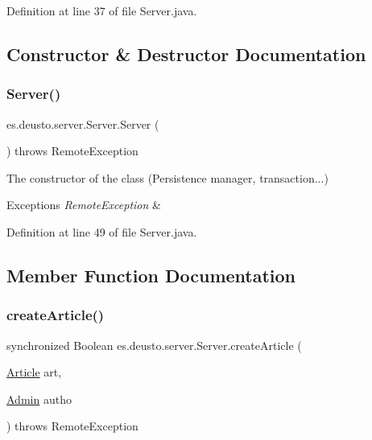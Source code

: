 Definition at line 37 of file Server.\+java.



\subsection{Constructor \& Destructor Documentation}
\mbox{\label{classes_1_1deusto_1_1server_1_1_server_a84f78162a65dd737f224eb2f94c43023}} 
\subsubsection{\texorpdfstring{Server()}{Server()}}
{\footnotesize\ttfamily es.\+deusto.\+server.\+Server.\+Server (\begin{DoxyParamCaption}{ }\end{DoxyParamCaption}) throws Remote\+Exception}

The constructor of the class (Persistence manager, transaction...)


\begin{DoxyExceptions}{Exceptions}
{\em Remote\+Exception} & \\
\hline
\end{DoxyExceptions}


Definition at line 49 of file Server.\+java.



\subsection{Member Function Documentation}
\mbox{\label{classes_1_1deusto_1_1server_1_1_server_a58363d9c2c5c5d1e085e22deeeebf833}} 
\subsubsection{\texorpdfstring{create\+Article()}{createArticle()}}
{\footnotesize\ttfamily synchronized Boolean es.\+deusto.\+server.\+Server.\+create\+Article (\begin{DoxyParamCaption}\item[{\hyperlink{classes_1_1deusto_1_1server_1_1jdo_1_1_article}{Article}}]{art,  }\item[{\hyperlink{classes_1_1deusto_1_1server_1_1jdo_1_1_admin}{Admin}}]{autho }\end{DoxyParamCaption}) throws Remote\+Exception}


